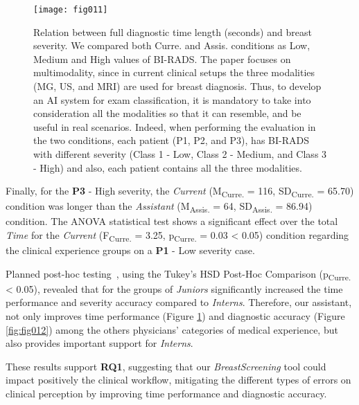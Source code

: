 
\begin{figure}[htbp]
\centering
\texttt{[image: fig011]}
\caption{Relation between full diagnostic time length (seconds) and breast severity. We compared both Curre. and Assis. conditions as Low, Medium and High values of BI-RADS. The paper focuses on multimodality, since in current clinical setups the three modalities (MG, US, and MRI) are used for breast diagnosis. Thus, to develop an AI system for exam classification, it is mandatory  to take into consideration all the modalities so that it can resemble, and be useful in real scenarios. Indeed, when performing the evaluation in the two conditions, each patient (P1, P2, and P3), has BI-RADS with different severity (Class 1 - Low, Class 2 - Medium, and Class 3 - High) and also, each patient contains all the three modalities.}
\label{fig:fig011}
\end{figure}

Finally, for the {\bf P3} - High severity, the {\it Current} (M\textsubscript{Curre.} = 116, SD\textsubscript{Curre.} = 65.70) condition was longer than the {\it Assistant} (M\textsubscript{Assis.} = 64, SD\textsubscript{Assis.} = 86.94) condition.
The ANOVA statistical test shows a significant effect over the total {\it Time} for the {\it Current} (F\textsubscript{Curre.} = 3.25, p\textsubscript{Curre.} = 0.03 < 0.05) condition regarding the clinical experience groups on a {\bf P1} - Low severity case.

Planned post-hoc testing~\cite{10.1145/2858036.2858360}, using the Tukey's HSD Post-Hoc Comparison (p\textsubscript{Curre.} < 0.05), revealed that for the groups of {\it Juniors} significantly increased the time performance and severity accuracy compared to {\it Interns}.
Therefore, our assistant, not only improves time performance (Figure \ref{fig:fig011}) and diagnostic accuracy (Figure \ref{fig:fig012}) among the others physicians' categories of medical experience, but also provides important support for {\it Interns}.

These results support {\bf RQ1}, suggesting that our {\it BreastScreening} tool could impact positively the clinical workflow, mitigating the different types of errors on clinical perception by improving time performance and diagnostic accuracy.

